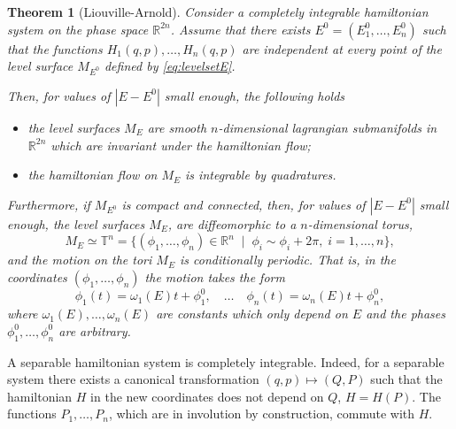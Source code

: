 \documentclass[english,fontsize=11pt,paper=a5,oneside]{scrbook}
\newcommand{\R}{\mathbb{R}}
\newcommand{\T}{\mathbb{T}}
\newtheorem{theorem}{Theorem}[chapter]
\theoremstyle{definition}
\newenvironment{remark}
  {\pushQED{\qed}\renewcommand{\qedsymbol}{$\lozenge$}\remarkx}
  {\popQED\endremarkx}
\begin{document}
\begin{theorem}[Liouville-Arnold]\label{thm:liouvillearnold}
  Consider a completely integrable hamiltonian system on the phase space $\R^{2n}$.
  Assume that there exists $E^0 = (E^0_1, \ldots, E^0_n)$ such that the functions $H_1(q,p), \ldots, H_n(q,p)$ are independent at every point of the level surface $M_{E^0}$ defined by \eqref{eq:levelsetE}.

  Then, for values of $|E-E^0|$ small enough, the following holds
  \begin{itemize}
    \item the level surfaces $M_E$ are smooth $n$-dimensional lagrangian submanifolds in $\R^{2n}$ which are invariant under the hamiltonian flow;
    \item the hamiltonian flow on $M_E$ is integrable by quadratures.
  \end{itemize}

  Furthermore, if $M_{E^0}$ is compact and connected, then, for values of $|E-E^0|$ small enough, the level surfaces $M_E$,  are diffeomorphic to a $n$-dimensional torus,
  \begin{equation}\label{eq:idtorusstd}
    M_E \simeq \T^n = \big\{ (\phi_1, \ldots, \phi_n)\in\R^n \;\mid\; \phi_i \sim \phi_i+2\pi, \; i=1,\ldots,n \big\},
  \end{equation}
  and the motion on the tori $M_E$ is \emph{conditionally periodic}. That is, in the coordinates $(\phi_1, \ldots, \phi_n)$ the motion takes the form
  \begin{equation}\label{eq:condperflow}
    \phi_1(t) = \omega_1(E) t + \phi_1^0,
    \quad\ldots\quad
    \phi_n(t) = \omega_n(E) t + \phi_n^0,
  \end{equation}
  where $\omega_1(E),\ldots,\omega_n(E)$ are constants which only depend on $E$ and the phases $\phi_1^0,\ldots,\phi_n^0$ are arbitrary.
\end{theorem}

\begin{remark}
  A separable hamiltonian system is completely integrable.
  Indeed, for a separable system there exists a canonical transformation $(q,p) \mapsto (Q,P)$ such that the hamiltonian $H$ in the new coordinates does not depend on $Q$, $H=H(P)$.
  The functions $P_1, \ldots, P_n$, which are in involution by construction, commute with $H$.
\end{remark}
\end{document}
